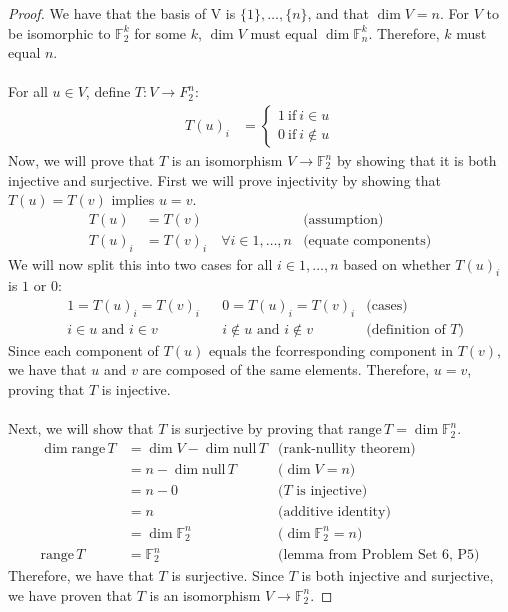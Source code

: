 \documentclass[12pt,reqno]{article}
\theoremstyle{definition}
\begin{document}
\begin{proof}
    We have that the basis of V is $\{1\},\ldots,\{n\}$, and that $\dim V = n$. For $V$ to be isomorphic to $\mathbb{F}^k_2$ for some $k$, $\dim V$ must equal $\dim \mathbb{F}^k_n$. Therefore, $k$ must equal $n$.
    \\\\
    For all $u\in V$, define $T: V \rightarrow F^n_2$:
    \begin{align*}
        T(u)_i&=
        \begin{cases}
            1\ \text{if}\ i\in u\\
            0\ \text{if}\ i\notin u
        \end{cases}
    \end{align*}
    Now, we will prove that $T$ is an isomorphism $V \rightarrow \mathbb{F}^n_2$ by showing that it is both injective and surjective. First we will prove injectivity by showing that $T(u)=T(v)$ implies $u=v$.
    \begin{align*}
        T(u)&=T(v) &\text{(assumption)}\\
        T(u)_i&=T(v)_i\quad\forall i\in 1,\ldots,n &\text{(equate components)}
    \end{align*}
    We will now split this into two cases for all $i\in 1,\ldots,n$ based on whether $T(u)_i$ is $1$ or $0$:
    \begin{align*}
        &1 = T(u)_i = T(v)_i & &0 = T(u)_i = T(v)_i &\text{(cases)}\\
        &i\in u\text{ and }i\in v & &i\notin u\text{ and }i\notin v &\text{(definition of $T$)}
    \end{align*}
    Since each component of $T(u)$ equals the fcorresponding component in $T(v)$, we have that $u$ and $v$ are composed of the same elements. Therefore, $u=v$, proving that $T$ is injective.
    \\\\
    Next, we will show that $T$ is surjective by proving that $\mathrm{range}\,T = \dim\mathbb{F}^n_2$.
    \begin{align*}
        \dim\mathrm{range}\,T &= \dim V - \dim\mathrm{null}\, T &\text{(rank-nullity theorem)}\\
        &= n - \dim\mathrm{null}\,T &\text{($\dim V=n$)}\\
        &= n - 0 &\text{($T$ is injective)}\\
        &= n &\text{(additive identity)}\\
        &= \dim\mathbb{F}^n_2 &\text{($\dim\mathbb{F}^n_2=n$)}\\
        \mathrm{range}\,T&=\mathbb{F}^n_2 &\text{(lemma from Problem Set 6, P5)}
    \end{align*}
    Therefore, we have that $T$ is surjective. Since $T$ is both injective and surjective, we have proven that $T$ is an isomorphism $V \rightarrow \mathbb{F}^n_2$.
\end{proof}
\end{document}
